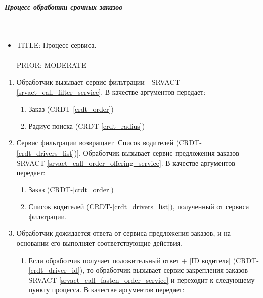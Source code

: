\subparagraph{Процесс обработки срочных заказов} \mbox{} \\ \label{}

  \begin{itemize}

       \item {
         TITLE: Процесс сервиса.\\
         \\
         PRIOR: MODERATE\\
       }

       \end{itemize}

  \begin{alg} \label{alg_urgent_order_processing} \mbox{}

      \begin{enumerate}

         	\item Обработчик вызывает сервис фильтрации - SRVACT-\ref{srvact_call_filter_service}. В качестве аргументов передает:

         		\begin{enumerate}
         			\item Заказ (CRDT-\ref{crdt_order})
         			\item Радиус поиска (CRDT-\ref{crdt_radius})
         		\end{enumerate}

          \item Сервис фильтрации возвращает [Список водителей (CRDT-\ref{crdt_drivers_list})]. Обработчик вызывает сервис предложения заказов - SRVACT-\ref{srvact_call_order_offering_service}. В качестве аргументов передает:

         		\begin{enumerate}
         			\item Заказ (CRDT-\ref{crdt_order})
         			\item Список водителей (CRDT-\ref{crdt_drivers_list}), полученный от сервиса фильтрации.
         		\end{enumerate}
        
          \item Обработчик дожидается ответа от сервиса предложения заказов, и на основании его выполняет соответствующие действия.
          
          	\begin{enumerate}
         			\item Если обработчик получает положительный ответ + [ID водителя] (CRDT-\ref{crdt_driver_id}), то обработчик вызывает сервис закрепления заказов - SRVACT-\ref{srvact_call_fasten_order_service} и переходит к следующему пункту процесса. В качестве аргументов передает: 


\end{enumerate}
\end{enumerate}
\end{alg}

